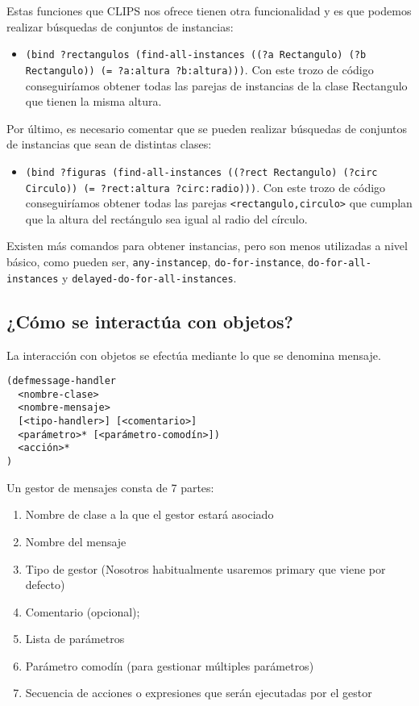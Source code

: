 \documentclass[11pt,svgnames]{scrbook}
\begin{document}
Estas funciones que CLIPS nos ofrece tienen otra funcionalidad y es que podemos
realizar búsquedas de conjuntos de instancias:


\begin{itemize}
\item 
\texttt{(bind ?rectangulos (find-all-instances ((?a Rectangulo) (?b Rectangulo))
(=
?a:altura ?b:altura)))}. Con este trozo de código conseguiríamos obtener todas
las parejas de instancias de la clase Rectangulo que tienen la misma altura. 
\end{itemize}

Por último, es necesario comentar que se pueden realizar búsquedas de conjuntos
de instancias que sean de distintas clases:


\begin{itemize}
\item 
\texttt{(bind ?figuras (find-all-instances ((?rect Rectangulo) (?circ Circulo))
(=
?rect:altura ?circ:radio)))}. Con este trozo de código conseguiríamos obtener
todas las parejas \texttt{<rectangulo,circulo>} que cumplan que la altura del
rectángulo
sea igual al radio del círculo.\end{itemize}


Existen más comandos para obtener instancias, pero son menos utilizadas a nivel
básico, como pueden ser, \break \texttt{any-instancep}, \texttt{do-for-instance},
\texttt{do-for-all-instances} y \texttt{delayed-do-for-all-instances}.




\subsection{¿Cómo se interactúa con objetos?}

La interacción con objetos se efectúa mediante lo que se denomina mensaje. 

\begin{verbatim}
(defmessage-handler
  <nombre-clase>
  <nombre-mensaje>
  [<tipo-handler>] [<comentario>]
  <parámetro>* [<parámetro-comodín>])
  <acción>*
)\end{verbatim} 

Un gestor de mensajes consta de 7 partes:
\begin{enumerate}
\item  Nombre de clase  a la que el gestor estará asociado
\item Nombre del mensaje
\item Tipo de gestor (Nosotros habitualmente usaremos primary que viene por
defecto)
\item Comentario (opcional);
\item Lista de parámetros
\item Parámetro comodín (para gestionar múltiples parámetros)
\item Secuencia de acciones o expresiones que serán ejecutadas por el gestor
\end{enumerate}
\end{document}
